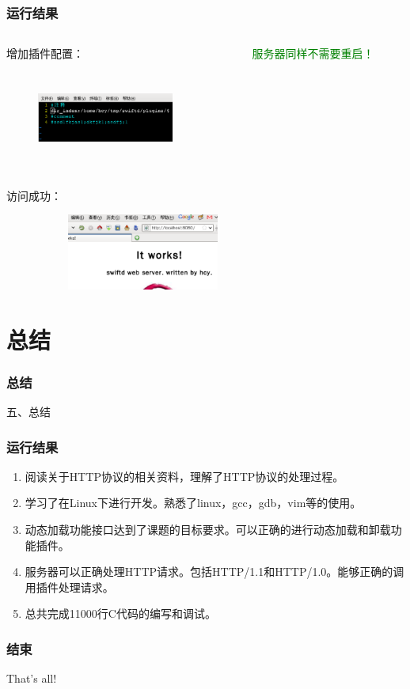 \documentclass[10pt,dvipdfm]{beamer}
\begin{document}
\begin{frame}
	\frametitle{运行结果}
	\begin{columns}
		\begin{column}{0.6\textwidth}
			增加插件配置：
			\begin{figure}[htbp]
			\centering
			\includegraphics[height=3cm, width=4.5cm]{pics/uncomplugin.eps}
			\end{figure}
		\end{column}
		
		\begin{column}{0.3\textwidth}
			\textcolor{green}{服务器同样不需要重启！}
		\end{column}
	\end{columns}
	
	访问成功：
	\begin{figure}[htbp]
	\centering
	\includegraphics[height=2.5cm, width=7cm]{pics/dirindex.eps}
	\end{figure}

\end{frame}

\section{总结}
\begin{frame}
	\frametitle{总结}
	\begin{center}
	{\Large
		五、总结
	}
	\end{center}
\end{frame}

\begin{frame}
	\frametitle{运行结果}
	\begin{enumerate}
		\item 阅读关于HTTP协议的相关资料，理解了HTTP协议的处理过程。
		\item 学习了在Linux下进行开发。熟悉了linux，gcc，gdb，vim等的使用。
		\item 动态加载功能接口达到了课题的目标要求。可以正确的进行动态加载和卸载功能插件。
		\item 服务器可以正确处理HTTP请求。包括HTTP/1.1和HTTP/1.0。能够正确的调用插件处理请求。
		\item 总共完成11000行C代码的编写和调试。
	\end{enumerate}
\end{frame}

\begin{frame}
	\frametitle{结束}
	\begin{center}
	{\Huge
		That's all!
	}
	\end{center}
\end{frame}
\end{document}
